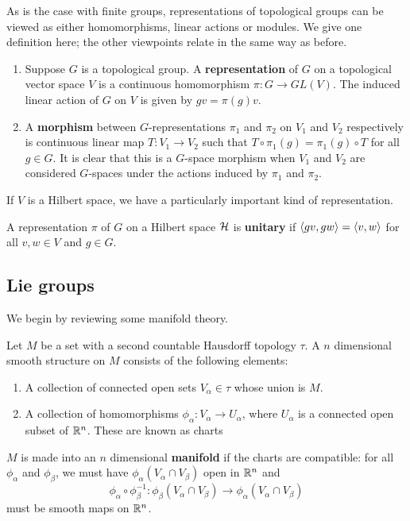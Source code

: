 \documentclass[a4paper]{article}
\begin{document}
As is the case with finite groups, representations of topological groups can be viewed as either homomorphisms, linear actions or modules. We give one definition here; the other viewpoints relate in the same way as before.

\begin{defi}[G-representation]\end{defi}
\begin{enumerate}
    \item Suppose $G$ is a topological group. A \textbf{representation} of $G$ on a topological vector space $V$ is a continuous homomorphism $\pi: G \to GL(V)$. The induced linear action of $G$ on $V$ is given by $gv = \pi(g)v$.
    \item A \textbf{morphism} between $G$-representations $\pi_1$ and $\pi_2$ on $V_1$ and $V_2$ respectively is continuous linear map $T: V_1 \to V_2$ such that $T \circ \pi_1(g) = \pi_1(g) \circ T$ for all $g\in G$. It is clear that this is a $G$-space morphism when $V_1$ and $V_2$ are considered $G$-spaces under the actions induced by $\pi_1$ and $\pi_2$.
\end{enumerate}

If $V$ is a Hilbert space, we have a particularly important kind of representation.

\begin{defi}
    A representation $\pi$ of $G$ on a Hilbert space $\mathcal{H}$ is \textbf{unitary} if $\left\langle gv , gw \right\rangle = \left\langle v , w \right\rangle$ for all $v, w \in V$ and $g \in G$.
\end{defi}

\subsection{Lie groups}
We begin by reviewing some manifold theory.

\begin{defi}[Manifold]
    Let $M$ be a set with a second countable Hausdorff topology $\tau$. A $n$ dimensional smooth structure on $M$ consists of the following elements:
    \begin{enumerate}
        \item A collection of connected open sets $V_\alpha \in \tau$ whose union is $M$. 
        \item A collection of homomorphisms $\phi_\alpha : V_\alpha \to U_\alpha$, where $U_\alpha$ is a connected open subset of $\mathbb{R}^n$. These are known as charts
    \end{enumerate}
    $M$ is made into an $n$ dimensional \textbf{manifold} if the charts are compatible: for all $\phi_\alpha$ and $\phi_\beta$, we must have $\phi_\alpha(V_\alpha \cap V_\beta)$ open in $\mathbb{R}^n$ and $$\phi_\alpha \circ  \phi_\beta ^{-1}: \phi_\beta(V_\alpha \cap V_\beta) \to \phi_\alpha(V_\alpha \cap V_\beta)$$ must be smooth maps on $\mathbb{R}^n$.
\end{defi}
\end{document}
